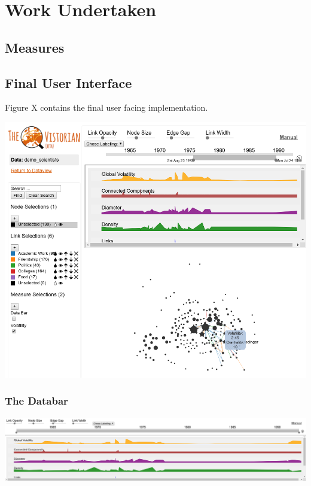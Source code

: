 
\chapter{Work Undertaken}

\section*{Measures}

\section{Final User Interface}
Figure X contains the final user facing implementation. 
\begin{center}
\includegraphics[trim={0 0 0 0}, width=140mm]{./Figures/finalUI.png}
\end{center}

\subsection{The Databar}

\begin{center}
\includegraphics[trim={0 0 0 0}, width=140mm]{./Figures/databar.png}
\end{center}

